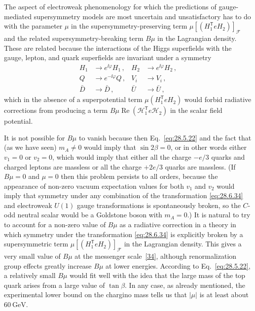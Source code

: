 The aspect of electroweak phenomenology for which the predictions of
gauge-mediated supersymmetry models are most uncertain and unsatisfactory
has to do with the parameter \(\mu\) in the supersymmetry-preserving term
\(\mu[(H_1^{\mathsf T}eH_2)]_{\mathcal{F}}\) and the related
supersymmetry-breaking term \(B\mu\) in the Lagrangian density. These are
related because the interactions of the Higgs superfields with the gauge,
lepton, and quark superfields are invariant under a symmetry
\begin{equation}
  \begin{aligned}
    H_1&\longrightarrow e^{\ii\varphi}H_1\,,
      &H_2&\longrightarrow e^{\ii\varphi}H_2\,,\\
    Q&\longrightarrow e^{-\ii\varphi}Q\,,
      &V_i&\longrightarrow V_i\,,\\
    \bar D&\longrightarrow\bar D\,,
      &\bar U&\longrightarrow\bar U\,,
  \end{aligned}
  \tag{28.6.34}\label{eq:28.6.34}
\end{equation}
which in the absence of a superpotential term
\(\mu(H_1^{\mathsf T}eH_2)\) would forbid radiative corrections from
producing a term
\(B\mu\operatorname{Re}(\mathcal{H}_1^{\mathsf T}e\mathcal{H}_2)\) in
the scalar field potential.

It is not possible for \(B\mu\) to vanish because then
Eq.~\eqref{eq:28.5.22} and the fact that (as we have seen) \(m_A\neq0\)
would imply that \(\sin2\beta=0\), or in other words either \(v_1=0\) or
\(v_2=0\), which would imply that either all the charge \(-e/3\) quarks
and charged leptons are massless or all the charge \(+2e/3\) quarks are
massless. (If \(B\mu=0\) and \(\mu=0\) then this problem persists to all
orders, because the appearance of non-zero vacuum expectation values for
both \(v_1\) and \(v_2\) would imply that symmetry under any combination
of the transformation \eqref{eq:28.6.34} and electroweak \(U(1)\) gauge
transformations is spontaneously broken, so the \(C\)-odd neutral scalar
would be a Goldstone boson with \(m_A=0\).) It is natural to try to account
for a non-zero value of \(B\mu\) as a radiative correction in a theory in
which symmetry under the transformation \eqref{eq:28.6.34} is explicitly
broken by a supersymmetric term
\(\mu[(H_1^{\mathsf T}eH_2)]_{\mathcal{F}}\) in the Lagrangian density.
This gives a very small value of \(B\mu\) at the messenger
scale~\hyperref[ch28-ref-34]{[34]}, although renormalization group effects
greatly increase \(B\mu\) at lower energies. According to
Eq.~\eqref{eq:28.5.22}, a relatively small \(B\mu\) would fit well with
the idea that the large mass of the top quark arises from a large value of
\(\tan\beta\). In any case, as already mentioned, the experimental lower
bound on the chargino mass tells us that \(\lvert\mu\rvert\) is at least
about \(60\ \mathrm{GeV}\).


